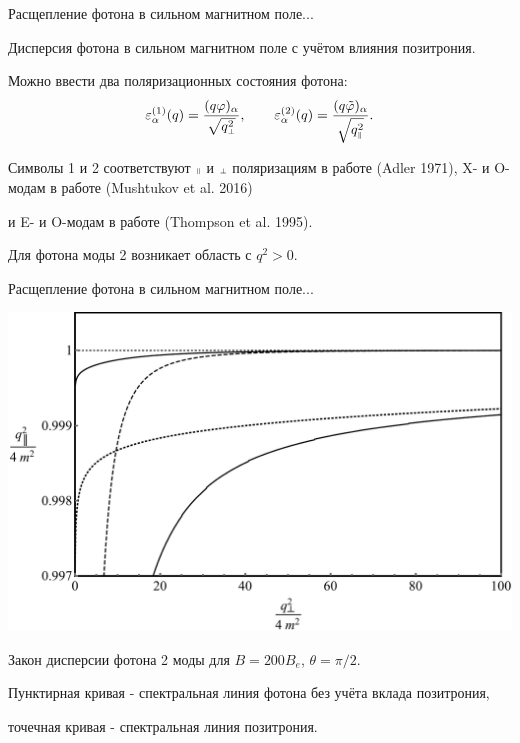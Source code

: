 \documentclass{beamer}
\def\mprp{\mbox{\tiny $\bot$}}
\def\mprl{\mbox{\tiny $\|$}}
\begin{document}
\begin{frame}{Расщепление фотона в сильном магнитном поле...}
\begin{center}
\alert{Дисперсия фотона в сильном магнитном поле с учётом влияния позитрония.}

\vspace*{2mm}

Можно ввести два поляризационных состояния фотона:
$$\varepsilon_\alpha^{(1)}(q) = \frac{(q \varphi)_\alpha}{\sqrt{q_{\mprp}^2}},
\qquad
\varepsilon_\alpha^{(2)}(q) = \frac{(q \tilde \varphi)_\alpha}
{\sqrt{q_{\mprl}^2}}.$$

Символы 1 и 2 соответствуют $\mprl$ и $\mprp$ поляризациям в работе (Adler 1971), X- и O-модам в работе (Mushtukov et al. 2016)

и E- и O-модам в работе (Thompson et al. 1995).

\vspace*{2mm}

\alert{Для фотона моды 2 возникает область с $q^2 > 0$.}
\end{center}
\end{frame}
\begin{frame}{Расщепление фотона в сильном магнитном поле...}
\begin{center}
\includegraphics[scale=0.35]{Disp200.pdf}

Закон дисперсии фотона 2 моды для $B = 200B_e$, $\theta = \pi/2$.

Пунктирная кривая -  спектральная линия фотона без учёта вклада позитрония,

точечная кривая - спектральная линия позитрония.
\end{center}
\end{frame}
\end{document}
